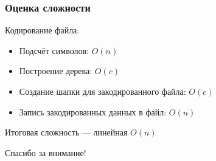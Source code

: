 \documentclass[10pt,pdf,hyperref={unicode}]{beamer}
\begin{document}
\begin{frame}
	\frametitle{Оценка сложности}
	Кодирование файла:\\ 
	\begin{itemize}
		\item Подсчёт символов: $O(n)$
		\item Построение дерева: $O(c)$
		\item Создание шапки для закодированного файла: $O(c)$
		\item Запись закодированных данных в файл: $O(n)$
	\end{itemize}
	Итоговая сложность --- линейная $O(n)$
\end{frame}

\begin{frame}
	\centerline{Спасибо за внимание!}
\end{frame}
\end{document}
